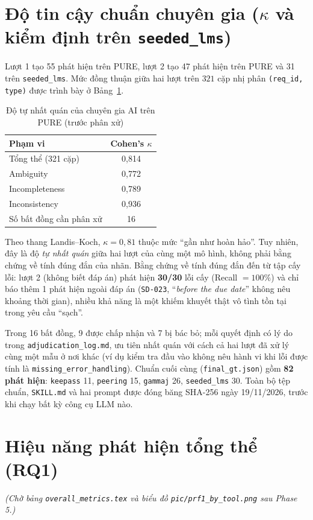 \documentclass[12pt,a4paper]{report}
\begin{document}
\section{Độ tin cậy chuẩn chuyên gia ($\kappa$ và kiểm định trên \texttt{seeded\_lms})}
Lượt 1 tạo 55 phát hiện trên PURE, lượt 2 tạo 47 phát hiện trên PURE và 31 trên \texttt{seeded\_lms}. Mức đồng thuận giữa hai lượt trên $321$ cặp nhị phân \texttt{(req\_id, type)} được trình bày ở Bảng~\ref{tab:gt_kappa}.

\begin{table}[H]
\centering
\caption{Độ tự nhất quán của chuyên gia AI trên PURE (trước phân xử)}
\label{tab:gt_kappa}
\begin{tabular}{lc}
\toprule
\textbf{Phạm vi} & \textbf{Cohen's $\kappa$} \\
\midrule
Tổng thể (321 cặp) & 0{,}814 \\
Ambiguity & 0{,}772 \\
Incompleteness & 0{,}789 \\
Inconsistency & 0{,}936 \\
\midrule
Số bất đồng cần phân xử & 16 \\
\bottomrule
\end{tabular}
\end{table}

Theo thang Landis--Koch, $\kappa = 0{,}81$ thuộc mức ``gần như hoàn hảo''. Tuy nhiên, đây là độ \textit{tự nhất quán} giữa hai lượt của cùng một mô hình, không phải bằng chứng về tính đúng đắn của nhãn. Bằng chứng về tính đúng đắn đến từ tập cấy lỗi: lượt 2 (không biết đáp án) phát hiện \textbf{30/30} lỗi cấy (Recall $= 100\%$) và chỉ báo thêm 1 phát hiện ngoài đáp án (\texttt{SD-023}, ``\textit{before the due date}'' không nêu khoảng thời gian), nhiều khả năng là một khiếm khuyết thật vô tình tồn tại trong yêu cầu ``sạch''.

Trong 16 bất đồng, 9 được chấp nhận và 7 bị bác bỏ; mỗi quyết định có lý do trong \texttt{adjudication\_log.md}, ưu tiên nhất quán với cách cả hai lượt đã xử lý cùng một mẫu ở nơi khác (ví dụ kiểm tra đầu vào không nêu hành vi khi lỗi được tính là \texttt{missing\_error\_handling}). Chuẩn cuối cùng (\texttt{final\_gt.json}) gồm \textbf{82 phát hiện}: \texttt{keepass} 11, \texttt{peering} 15, \texttt{gammaj} 26, \texttt{seeded\_lms} 30. Toàn bộ tệp chuẩn, \texttt{SKILL.md} và hai prompt được đóng băng SHA-256 ngày 19/11/2026, trước khi chạy bất kỳ công cụ LLM nào.

\section{Hiệu năng phát hiện tổng thể (RQ1)}
\textit{(Chờ bảng \texttt{overall\_metrics.tex} và biểu đồ \texttt{pic/prf1\_by\_tool.png} sau Phase 5.)}
\end{document}
